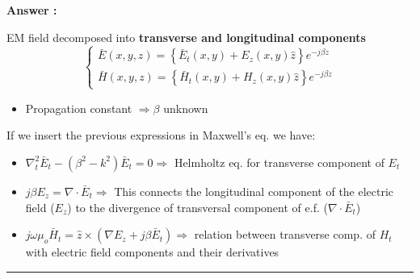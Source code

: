 \documentclass[a4paper,11pt]{book}
\newcounter{qacount}
\newenvironment{answer}{
  \noindent\textbf{Answer \theqacount:}\space
}{
  \par\vspace{1em}   %
  \hrule             %
  \vspace{0.5em}     %
}
\begin{document}
\begin{answer}
    EM field decomposed into \textbf{transverse and longitudinal components}
    \begin{equation*}
        \boxed{
            \begin{cases}
                \bar{E}(x,y,z) = \left\{ \bar{E}_t(x,y) + E_z(x,y)\hat{z} \right\} e^{-j\beta z} \\
                \bar{H}(x,y,z) = \left\{ \bar{H}_t(x,y) + H_z(x,y)\hat{z} \right\} e^{-j\beta z}
            \end{cases}
        }
    \end{equation*}
    \begin{itemize}
        \item Propagation constant $\Rightarrow \beta$ unknown
    \end{itemize}

    \vspace{1em}
    \noindent If we insert the previous expressions in Maxwell's eq. we have:

    \begin{itemize}
        \item[\textbf{[1]}] $\nabla_t^2 \bar{E}_t - (\beta^2 - k^2) \bar{E}_t = 0 \Rightarrow$ Helmholtz eq. for transverse component of $E_t$

        \item[\textbf{[2]}] $j \beta E_z = \nabla \cdot \bar{E}_t \Rightarrow$ This connects the longitudinal component of the electric field ($E_z$) to the divergence of transversal component of e.f. ($\nabla \cdot \bar{E}_t$)

        \item[\textbf{[3a]}] $j \omega \mu_o \bar{H}_t = \hat{z} \times (\nabla E_z + j \beta \bar{E}_t) \Rightarrow$ relation between transverse comp. of $H_t$ with electric field components and their derivatives


\end{itemize}
\end{answer}
\end{document}
